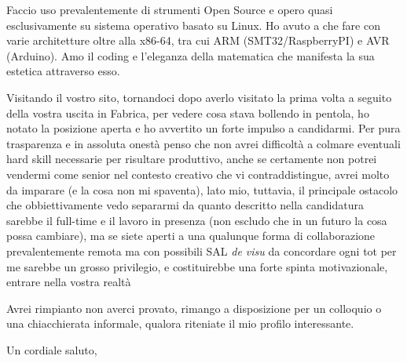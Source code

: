 \documentclass[a4paper,10pt]{letter}
\begin{document}
\begin{letter}{}
  Faccio uso prevalentemente di strumenti Open Source e opero quasi esclusivamente su sistema operativo basato su Linux.  Ho avuto a che fare con varie architetture  oltre alla x86-64, tra cui ARM (SMT32/RaspberryPI) e AVR (Arduino). Amo il coding e l'eleganza della matematica che manifesta la sua estetica attraverso esso.

  Visitando il vostro sito, tornandoci dopo averlo visitato la prima volta a seguito della vostra uscita in Fabrica, per  vedere cosa stava bollendo in pentola, ho notato la posizione aperta e ho avvertito un forte impulso a candidarmi. Per pura trasparenza e in assoluta onestà penso che non avrei difficoltà a colmare eventuali hard skill necessarie per risultare produttivo, anche se certamente non potrei vendermi come senior nel contesto creativo che vi contraddistingue, avrei molto da imparare (e la cosa non mi spaventa), lato mio, tuttavia, il principale ostacolo che obbiettivamente vedo separarmi da quanto descritto nella candidatura sarebbe il full-time e il lavoro in presenza (non escludo che in un futuro la cosa possa cambiare), ma se siete aperti a una qualunque forma di collaborazione prevalentemente remota ma con possibili SAL \textit{de visu} da concordare ogni tot per me sarebbe un grosso privilegio, e costituirebbe una forte spinta motivazionale, entrare nella vostra realtà

Avrei rimpianto non averci provato, rimango a disposizione per un colloquio o una chiacchierata informale, qualora riteniate il mio profilo interessante.


\closing{Un cordiale saluto,}

\end{letter}
\end{document}
